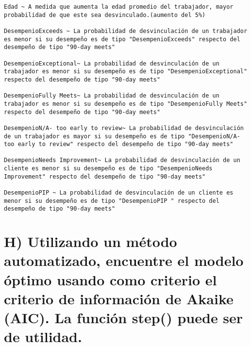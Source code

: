 \documentclass[
]{article}
\begin{document}
\begin{verbatim}
Edad ~ A medida que aumenta la edad promedio del trabajador, mayor probabilidad de que este sea desvinculado.(aumento del 5%)

DesempenioExceeds ~ La probabilidad de desvinculación de un trabajador es menor si su desempeño es de tipo "DesempenioExceeds" respecto del desempeño de tipo "90-day meets" 

DesempenioExceptional~ La probabilidad de desvinculación de un trabajador es menor si su desempeño es de tipo "DesempenioExceptional" respecto del desempeño de tipo "90-day meets"

DesempenioFully Meets~ La probabilidad de desvinculación de un trabajador es menor si su desempeño es de tipo "DesempenioFully Meets" respecto del desempeño de tipo "90-day meets"

DesempenioN/A- too early to review~ La probabilidad de desvinculación de un trabajador es mayor si su desempeño es de tipo "DesempenioN/A- too early to review" respecto del desempeño de tipo "90-day meets"

DesempenioNeeds Improvement~ La probabilidad de desvinculación de un cliente es menor si su desempeño es de tipo "DesempenioNeeds Improvement" respecto del desempeño de tipo "90-day meets"

DesempenioPIP ~ La probabilidad de desvinculación de un cliente es menor si su desempeño es de tipo "DesempenioPIP " respecto del desempeño de tipo "90-day meets" 
\end{verbatim}

\hypertarget{h-utilizando-un-muxe9todo-automatizado-encuentre-el-modelo-uxf3ptimo-usando-como-criterio-el-criterio-de-informaciuxf3n-de-akaike-aic.-la-funciuxf3n-step-puede-ser-de-utilidad.}{%
\section{H) Utilizando un método automatizado, encuentre el modelo
óptimo usando como criterio el criterio de información de Akaike (AIC).
La función step() puede ser de
utilidad.}\label{h-utilizando-un-muxe9todo-automatizado-encuentre-el-modelo-uxf3ptimo-usando-como-criterio-el-criterio-de-informaciuxf3n-de-akaike-aic.-la-funciuxf3n-step-puede-ser-de-utilidad.}}
\end{document}
